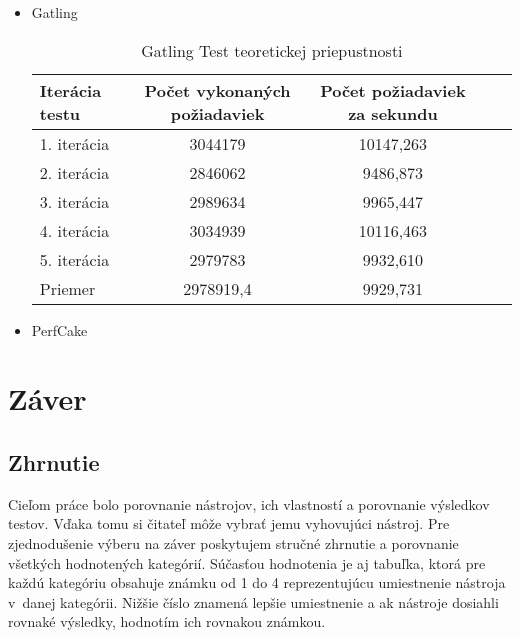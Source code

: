 \documentclass[12pt,oneside,final]{fithesis-utf8}
\begin{document}
\begin{itemize}
\item Gatling

\begin{table}[H]
\begin{center}
\begin{tabular}{ | l | c | c | c | c |}
		\hline
		 \textbf{Iterácia testu} & \textbf{Počet vykonaných požiadaviek} & \textbf{Počet požiadaviek za sekundu} \\ \hline
		 1. iterácia & 3044179 & 10147,263 \\ \hline
		 2. iterácia & 2846062 & 9486,873 \\ \hline
		 3. iterácia & 2989634 & 9965,447 \\ \hline
		 4. iterácia & 3034939 & 10116,463 \\ \hline
		 5. iterácia & 2979783 & 9932,610 \\ \hline
		 Priemer & 2978919,4 & 9929,731 \\ \hline
		 
\end{tabular}
\end{center}
\caption{Gatling Test teoretickej priepustnosti}
\end{table}

\item PerfCake

\end{itemize}


\chapter{Záver}

\section{Zhrnutie}
Cieľom práce bolo porovnanie nástrojov, ich vlastností a porovnanie výsledkov testov. Vďaka tomu si čitateľ môže vybrať jemu vyhovujúci nástroj. Pre zjednodušenie výberu na záver poskytujem stručné zhrnutie a porovnanie všetkých hodnotených kategórií. Súčasťou hodnotenia je aj tabuľka, ktorá pre každú kategóriu obsahuje známku od 1 do 4 reprezentujúcu umiestnenie nástroja v~danej kategórii. Nižšie číslo znamená lepšie umiestnenie a ak nástroje dosiahli rovnaké výsledky, hodnotím ich rovnakou známkou.
\end{document}
